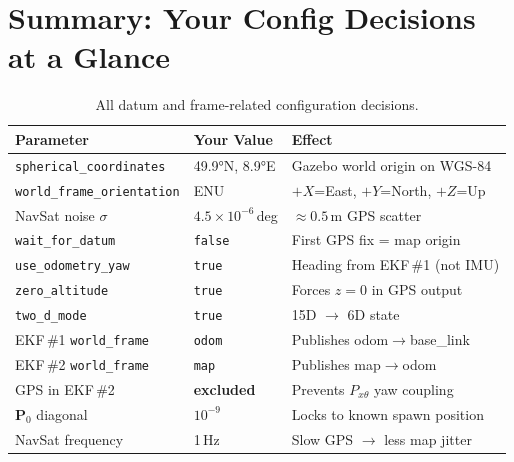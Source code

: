 \documentclass[11pt,a4paper]{article}
\begin{document}
\section{Summary: Your Config Decisions at a Glance}

\begin{table}[H]
\centering
\small
\begin{tabular}{@{}p{5cm}p{3cm}p{6cm}@{}}
\toprule
\textbf{Parameter} & \textbf{Your Value} & \textbf{Effect} \\
\midrule
\texttt{spherical\_coordinates} & 49.9°N, 8.9°E & Gazebo world origin on WGS-84 \\
\texttt{world\_frame\_orientation} & ENU & $+X$=East, $+Y$=North, $+Z$=Up \\
NavSat noise $\sigma$ & $4.5\times10^{-6}$\,deg & $\approx 0.5$\,m GPS scatter \\
\texttt{wait\_for\_datum} & \texttt{false} & First GPS fix = map origin \\
\texttt{use\_odometry\_yaw} & \texttt{true} & Heading from EKF\,\#1 (not IMU) \\
\texttt{zero\_altitude} & \texttt{true} & Forces $z = 0$ in GPS output \\
\texttt{two\_d\_mode} & \texttt{true} & 15D $\rightarrow$ 6D state \\
EKF\,\#1 \texttt{world\_frame} & \texttt{odom} & Publishes odom$\rightarrow$base\_link \\
EKF\,\#2 \texttt{world\_frame} & \texttt{map} & Publishes map$\rightarrow$odom \\
GPS in EKF\,\#2 & \textbf{excluded} & Prevents $P_{x\theta}$ yaw coupling \\
$\mathbf{P}_0$ diagonal & $10^{-9}$ & Locks to known spawn position \\
NavSat frequency & 1\,Hz & Slow GPS $\rightarrow$ less map jitter \\
\bottomrule
\end{tabular}
\caption{All datum and frame-related configuration decisions.}
\end{table}
\end{document}
